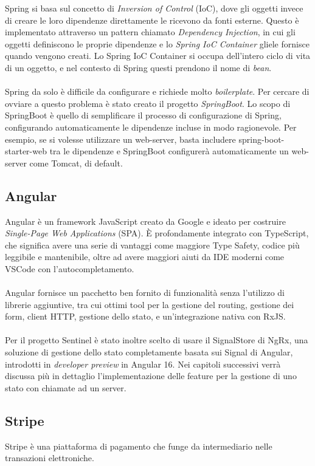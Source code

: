 Spring si basa sul concetto di \textit{Inversion of Control} (IoC), dove gli oggetti invece di creare le loro dipendenze direttamente le ricevono da fonti esterne.
Questo \`e implementato attraverso un pattern chiamato \textit{Dependency Injection}, in cui gli oggetti definiscono le proprie dipendenze e lo \textit{Spring IoC Container}
gliele fornisce quando vengono creati.
Lo Spring IoC Container si occupa dell'intero ciclo di vita di un oggetto, e nel contesto di Spring questi prendono il nome di \textit{bean}.
\\\\
Spring da solo \`e difficile da configurare e richiede molto \textit{boilerplate}. Per cercare di ovviare a questo problema \`e stato creato il progetto \textit{SpringBoot}.
Lo scopo di SpringBoot \`e quello di semplificare il processo di configurazione di Spring, configurando automaticamente le dipendenze incluse in modo ragionevole.
Per esempio, se si volesse utilizzare un web-server, basta includere spring-boot-starter-web tra le dipendenze e SpringBoot configurer\`a automaticamente un web-server come Tomcat, di default.
\subsection{Angular}
Angular \`e un framework JavaScript creato da Google e ideato per costruire \textit{Single-Page Web Applications} (SPA).
\`E profondamente integrato con TypeScript, che significa avere una serie di vantaggi come maggiore Type Safety, codice pi\`u leggibile e mantenibile,
oltre ad avere maggiori aiuti da IDE moderni come VSCode con l'autocompletamento.
\\\\
Angular fornisce un pacchetto ben fornito di funzionalit\`a senza l'utilizzo di librerie aggiuntive, tra cui ottimi tool per la gestione del routing, gestione dei form,
client HTTP, gestione dello stato, e un'integrazione nativa con RxJS.
\\\\
Per il progetto Sentinel \`e stato inoltre scelto di usare il SignalStore di NgRx, una soluzione di gestione dello stato completamente basata sui Signal di Angular,
introdotti in \textit{developer preview} in Angular 16.
Nei capitoli successivi verr\`a discussa pi\`u in dettaglio l'implementazione delle feature per la gestione di uno stato con chiamate ad un server.

\subsection{Stripe}
Stripe \`e una piattaforma di pagamento che funge da intermediario nelle transazioni elettroniche.

